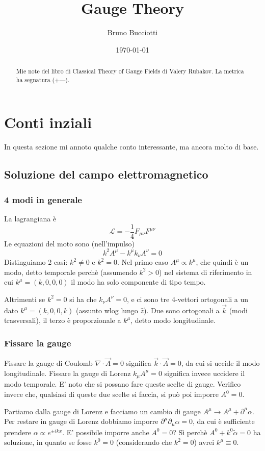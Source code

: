 \documentclass[12pt,oneside,notitlepage,abstracton,a4paper]{scrartcl}
\title{\Large Gauge Theory}
\author{Bruno Bucciotti}
\date{\normalsize \today}
\renewcommand{\L}{\mathcal{L}}
\begin{document}
\maketitle

\begin{abstract}
	Mie note del libro di Classical Theory of Gauge Fields di Valery Rubakov. La metrica ha segnatura (+---).
\end{abstract}

\section{Conti inziali}
In questa sezione mi annoto qualche conto interessante, ma ancora molto di base.
\subsection{Soluzione del campo elettromagnetico}
\subsubsection{4 modi in generale}
La lagrangiana è
\[ \L = -\dfrac{1}{4} F_{\mu\nu} F^{\mu\nu} \]
Le equazioni del moto sono (nell'impulso)
\[ k^2 A^\mu - k^\mu k_\nu A^\nu = 0 \]
Distinguiamo 2 casi: $k^2\neq0$ e $k^2=0$. Nel primo caso $A^\mu \propto k^\mu$, che quindi è un modo, detto temporale perchè (assumendo $k^2>0$) nel sistema di riferimento in cui $k^\mu = (k, 0,0,0)$ il modo ha solo componente di tipo tempo.

Altrimenti se $k^2=0$ si ha che $k_\nu A^\nu = 0$, e ci sono tre 4-vettori ortogonali a un dato $k^\mu = (k, 0, 0, k)$ (assunto wlog lungo $\hat{z}$). Due sono ortogonali a $\vec{k}$ (modi trasversali), il terzo è proporzionale a $k^\mu$, detto modo longitudinale.
\subsubsection{Fissare la gauge}
Fissare la gauge di Coulomb $\nabla\cdot \vec{A} = 0$ significa $\vec{k}\cdot\vec{A}=0$, da cui si uccide il modo longitudinale. Fissare la gauge di Lorenz $k_\mu A^\mu= 0$ significa invece uccidere il modo temporale. E' noto che si possano fare queste scelte di gauge. Verifico invece che, qualsiasi di queste due scelte si faccia, si può poi imporre $A^0 = 0$.

Partiamo dalla gauge di Lorenz e facciamo un cambio di gauge $A^\mu \rightarrow A^\mu + \partial^\mu \alpha$. Per restare in gauge di Lorenz dobbiamo imporre $\partial^\mu\partial_\mu \alpha = 0$, da cui è sufficiente prendere $\alpha \propto e^{\pm i kx}$. E' possibile imporre anche $A^0 = 0$? Sì perchè $A^0 + k^0 \tilde{\alpha} = 0$ ha soluzione, in quanto se fosse $k^0=0$ (considerando che $k^2=0$) avrei $k^\mu \equiv 0$.
\end{document}
